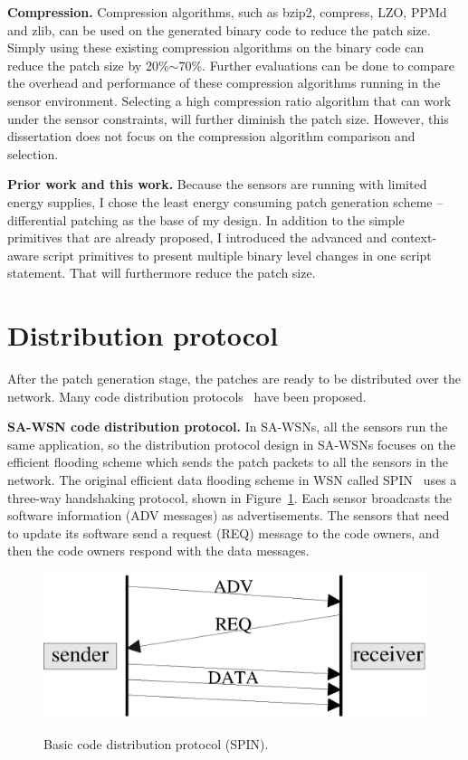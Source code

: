 \textbf{Compression.}
Compression algorithms, such as bzip2, compress, LZO, PPMd and zlib, can be used on the generated binary code to reduce 
the patch size. Simply using these existing compression algorithms on the binary code can reduce the patch size by 
20\%$\sim$70\%. 
Further evaluations can be done to compare the overhead and performance of these compression algorithms running in the
sensor environment.
Selecting a high compression ratio algorithm that can work under the sensor constraints, 
will further diminish the patch size. However, this dissertation does not focus on the compression algorithm
comparison and selection.


\textbf{Prior work and this work.}
Because the sensors are running with limited energy supplies, I chose the least energy consuming patch generation 
scheme -- differential patching as the base of my design.
In addition to the simple primitives that are already proposed, I introduced the advanced and context-aware script 
primitives to 
present multiple binary level changes in one script statement.
That will furthermore reduce the patch size.

\section{Distribution protocol}

After the patch generation stage, the patches are ready to be distributed over the network. Many code distribution 
protocols~\cite{spin,trickle,melete,deluge,mnp} have been proposed.

\textbf{SA-WSN code distribution protocol.}
In SA-WSNs, all the sensors run the same application, so the distribution protocol design in SA-WSNs focuses on the 
efficient flooding scheme which sends the patch packets to all the sensors in the network. The original efficient data 
flooding scheme in WSN called SPIN~\cite{spin} uses a three-way handshaking protocol, shown in Figure~\ref{fig:spin}. 
Each sensor broadcasts the software information (ADV messages) as advertisements. The sensors that need to update its 
software send a request (REQ) message to the code owners, and then the code owners respond with the data messages.

\begin{figure}[htbp]
	\centering
		\includegraphics[scale=0.45]{figures/basic-protocol.eps}
	\label{fig:spin}
	\caption{Basic code distribution protocol (SPIN).}
\end{figure}

